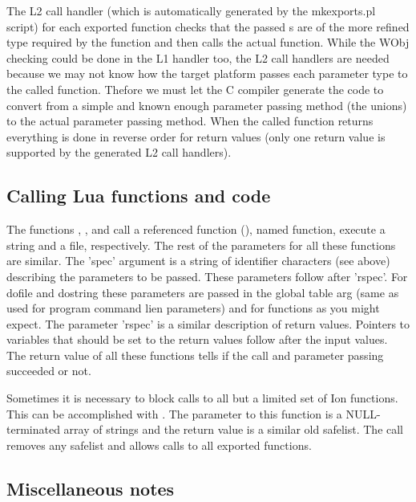The L2 call handler (which is automatically generated by the mkexports.pl
script) for each exported function checks that the passed s
are of the more refined type required by the function and then calls the
actual function. While the WObj checking could be done in the L1 handler
too, the L2 call handlers are needed because we may not know how the target
platform passes each parameter type to the called function. Thefore we
must let the C compiler generate the code to convert from a simple and
known enough parameter passing method (the unions) to the actual
parameter passing method. When the called function returns everything
is done in reverse order for return values (only one return value is
supported by the generated L2 call handlers).


\subsection{Calling Lua functions and code}
\label{sec:calling}

The functions
,
,
 and
call a referenced function (), named function, execute a
string and a file, respectively. The rest of the parameters for all these
functions are similar. The 'spec' argument is a string of identifier
characters (see above) describing the parameters to be passed. These
parameters follow after 'rspec'. For dofile and dostring these parameters
are passed in the global table arg (same as used for program command
lien parameters) and for functions as you might expect. The parameter
'rspec' is a similar description of return values. Pointers to variables
that should be set to the return values follow after the input values.
The return value of all these functions tells if the call and parameter
passing succeeded or not.

Sometimes it is necessary to block calls to all but a limited set of
Ion functions. This can be accomplished with
.
The parameter to this function is a NULL-terminated array of strings
and the return value is a similar old safelist.
The call  removes any safelist and allows
calls to all exported functions.


\subsection{Miscellaneous notes}

